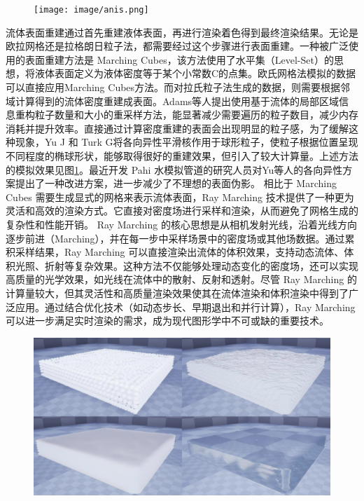 \begin{figure}[ht]
 \centering
 \texttt{[image: image/anis.png]}
 \label{fig:anis}
\end{figure}

\indent 流体表面重建通过首先重建液体表面，再进行渲染着色得到最终渲染结果。无论是欧拉网格还是拉格朗日粒子法，都需要经过这个步骤进行表面重建。一种被广泛使用的表面重建方法是 Marching Cubes\cite{lorensen1998marching}，该方法使用了水平集（Level-Set）\cite{sethian2003level}的思想，将液体表面定义为液体密度等于某个小常数C的点集。欧氏网格法模拟的数据可以直接应用Marching Cubes方法。而对拉氏粒子法生成的数据，则需要根据邻域计算得到的流体密度重建成表面。Adams等人\cite{adams2007adaptively}提出使用基于流体的局部区域信息重构粒子数量和大小的重采样方法，能显著减少需要遍历的粒子数目，减少内存消耗并提升效率。直接通过计算密度重建的表面会出现明显的粒子感，为了缓解这种现象，Yu J 和 Turk G\cite{yu2013reconstructing}将各向异性平滑核作用于球形粒子，使粒子根据位置呈现不同程度的椭球形状，能够取得很好的重建效果，但引入了较大计算量。上述方法的模拟效果见图\ref{fig:anis}。最近开发 Pahi 水模拟管道的研究人员\cite{stomakhin2023pahi}对Yu等人的各向异性方案提出了一种改进方案，进一步减少了不理想的表面伪影。
相比于 Marching Cubes 需要生成显式的网格来表示流体表面，Ray Marching 技术\cite{hart1996sphere, wald2005interactive}提供了一种更为灵活和高效的渲染方式。它直接对密度场进行采样和渲染，从而避免了网格生成的复杂性和性能开销。
\newline
\indent Ray Marching 的核心思想是从相机发射光线，沿着光线方向逐步前进（Marching），并在每一步中采样场景中的密度场或其他场数据。通过累积采样结果，Ray Marching 可以直接渲染出流体的体积效果，支持动态流体、体积光照、折射等复杂效果。这种方法不仅能够处理动态变化的密度场，还可以实现高质量的光学效果，如光线在流体中的散射、反射和透射。尽管 Ray Marching 的计算量较大，但其灵活性和高质量渲染效果使其在流体渲染和体积渲染中得到了广泛应用。通过结合优化技术（如动态步长、早期退出和并行计算），Ray Marching 可以进一步满足实时渲染的需求，成为现代图形学中不可或缺的重要技术。 


\begin{figure}[ht]
 \centering
 \includegraphics[width=12cm]{image/ssr.png}
 \label{fig:ssr}
\end{figure}

